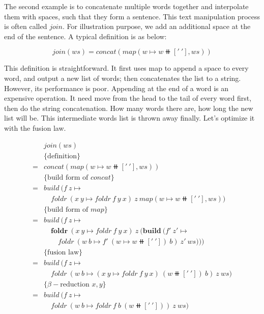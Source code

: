 \documentclass[b5paper]{article}
\begin{document}
\begin{example}
\normalfont
The second example is to concatenate multiple words together and interpolate them with spaces, such that they form a sentence. This text manipulation process is often called $join$. For illustration purpose, we add an additional space at the end of the sentence. A typical definition is as below:

\[
join(ws) = concat(map(w \mapsto w \doubleplus ['\ '], ws))
\]

This definition is straightforward. It first uses map to append a space to every word, and output a new list of words; then concatenates the list to a string. However, its performance is poor. Appending at the end of a word is an expensive operation. It need move from the head to the tail of every word first, then do the string concatenation. How many words there are, how long the new list will be. This intermediate words list is thrown away finally. Let's optimize it with the fusion law.

\[ \begin{array}{rl}
  & join(ws) \\
  & \{\text{definition} \} \\
= & concat(map(w \mapsto w \doubleplus ['\ '], ws)) \\

  & \{\text{build form of } concat\} \\
= & build\ (f\ z \mapsto \\
  & \quad foldr\ (x\ y \mapsto foldr\ f\ y\ x)\ z\ map(w \mapsto w \doubleplus ['\ '], ws)) \\

  & \{\text{build form of } map\} \\
= & build\ (f\ z \mapsto \\
  & \quad \pmb{foldr}\ (x\ y \mapsto foldr\ f\ y\ x)\ z\ (\pmb{build}\ (f'\ z' \mapsto \\
  & \quad \quad foldr\ (w\ b \mapsto f'\ (w \mapsto w \doubleplus ['\ '])\ b)\ z'\ ws))) \\

  & \{\text{fusion law}\} \\
= & build\ (f\ z \mapsto \\
  & \quad foldr\ (w\ b \mapsto (x\ y \mapsto foldr\ f\ y\ x)\ (w \doubleplus ['\ '])\ b)\ z\ ws) \\

  & \{\beta-\text{reduction } x, y\} \\
= & build\ (f\ z \mapsto \\
  & \quad foldr\ (w\ b \mapsto foldr\ f\ b\ (w \doubleplus ['\ ']))\ z\ ws) \\


\end{array}\]
\end{example}
\end{document}
